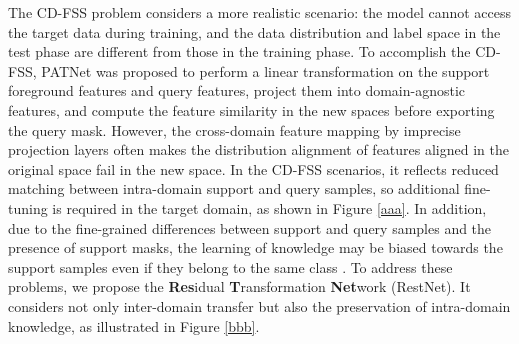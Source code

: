 \documentclass{bmvc2k}
\begin{document}
The CD-FSS problem considers a more realistic scenario: the model cannot access the target data during training, and the data distribution and label space in the test phase are different from those in the training phase. 
To accomplish the CD-FSS, PATNet \cite{lei2022cross} was proposed to perform a linear transformation on the support foreground features and query features, project them into domain-agnostic features, and compute the feature similarity in the new spaces before exporting the query mask.
However, the cross-domain feature mapping by imprecise projection layers often makes the distribution alignment of features aligned in the original space fail in the new space.
In the CD-FSS scenarios, it reflects reduced matching between intra-domain support and query samples, so additional fine-tuning is required in the target domain, as shown in Figure \ref{aaa}.
In addition, due to the fine-grained differences between support and query samples and the presence of support masks, the learning of knowledge may be biased towards the support samples even if they belong to the same class \cite{zha2023boosting}. 
To address these problems, we propose the \textbf{Res}idual \textbf{T}ransformation \textbf{Net}work (RestNet). 
It considers not only inter-domain transfer but also the preservation of intra-domain knowledge, as illustrated in Figure \ref{bbb}.
\end{document}
